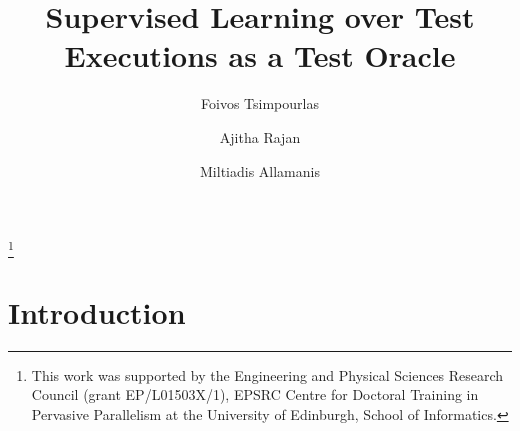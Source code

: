 \documentclass[sigconf]{acmart}
\begin{document}
 

\title{Supervised Learning over Test Executions as a Test Oracle}\thanks{This work was supported by the Engineering and Physical Sciences Research Council (grant EP/L01503X/1), EPSRC Centre for Doctoral Training in Pervasive Parallelism at the University of Edinburgh, School of Informatics.}

\author{Foivos Tsimpourlas}

\author{Ajitha Rajan}

\author{Miltiadis Allamanis}


\iffalse
\author{\IEEEauthorblockN{Foivos Tsimpourlas}
	\IEEEauthorblockA{\textit{University of Edinburgh} \\
		F.Tsimpourlas@sms.ed.ac.uk}
	\and
	\IEEEauthorblockN{Ajitha Rajan}
	\IEEEauthorblockA{\textit{University of Edinburgh} \\
		arajan@ed.ac.uk}
	\and
	\IEEEauthorblockN{Miltiadis Allamanis}
	\IEEEauthorblockA{\textit{Microsoft Research} \\
		miallama@microsoft.com}
}
\fi



\begin{abstract}

\end{abstract}

\maketitle

\section{Introduction}
\label{sec:intro}

\end{document}
